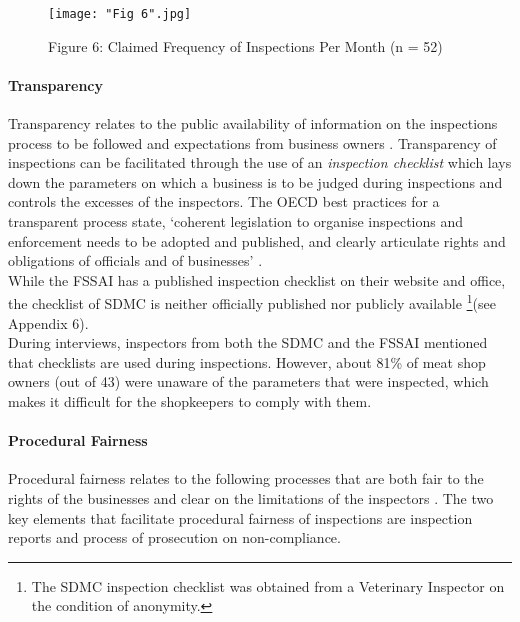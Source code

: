 \documentclass[a4paper, 12pt]{article}
\begin{document}
\begin{figure}[H]
\centering
\texttt{[image: "Fig 6".jpg]}
\caption[Optional Caption]{Figure 6: Claimed Frequency of Inspections Per Month (n = 52)}
\end{figure} 

\paragraph{Transparency}

Transparency relates to the public availability of information on the inspections process to be followed and expectations from business owners \parencite{blancreport}. Transparency of inspections can be facilitated through the use of an \textit {inspection checklist} which lays down the parameters on which a business is to be judged during inspections and controls the excesses of the inspectors. The OECD best practices for a transparent process state, ‘coherent legislation to organise inspections and enforcement needs to be adopted and published, and clearly articulate rights and obligations of officials and of businesses’ \parencite{oecd1report}.\\

While the FSSAI has a published inspection checklist on their website and office, the checklist of SDMC is neither officially published nor publicly available \footnote{ The SDMC inspection checklist was obtained from a Veterinary Inspector on the condition of anonymity.}(see Appendix 6). \\

During interviews, inspectors from both the SDMC and the FSSAI mentioned that checklists are used during inspections. However, about 81\% of meat shop owners (out of 43) were unaware of the parameters that were inspected, which makes it difficult for the shopkeepers to comply with them. \\

\paragraph{Procedural Fairness}

Procedural fairness relates to the following processes that are both fair to the rights of the businesses and clear on the limitations of the inspectors \parencite{oecdreport}. The two key elements that facilitate procedural fairness of inspections are inspection reports and process of prosecution on non-compliance.\\
\end{document}
